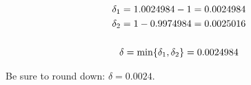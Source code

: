\documentclass[letterpaper,12pt,fleqn]{article}
\renewcommand{\d}{\delta}
\begin{document}
\begin{example}
  \begin{gather*}
    \d_1=1.0024984-1=0.0024984 \\
    \d_2=1-0.9974984=0.0025016 \\
    \\
    \d=\min\set{\d_1,\d_2}=0.0024984
  \end{gather*}

  Be sure to round down: \(\d=0.0024\).
\end{example}
\end{document}
